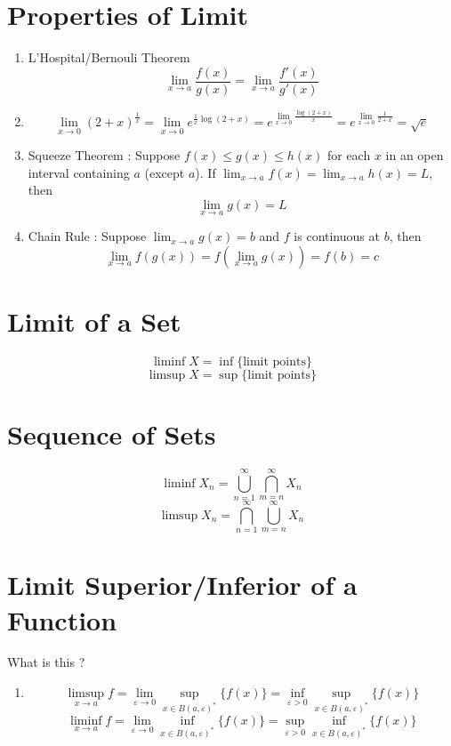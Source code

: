 \section{Properties of Limit}
\begin{enumerate}
	\item L'Hospital/Bernouli Theorem
	\[ \lim_{x \to a} \frac{f(x)}{g(x)} = \lim_{x \to a} \frac{f'(x)}{g'(x)} \]
	\item \[ \lim_{x \to 0} (2+x)^\frac{1}{x} = \lim_{x \to 0} e^{\frac{1}{x} \log (2+x)} = e^{\displaystyle \lim_{x \to 0} \frac{\log(2+x)}{x}} = e^{\displaystyle \lim_{x \to 0} \frac{1}{2+x}} = \sqrt{e} \]
	\item Squeeze Theorem :
	Suppose $f(x) \le g(x) \le h(x)$ for each $x$ in an open interval containing $a$ (except $a$).
	If $\displaystyle \lim_{x \to a} f(x) = \lim_{x \to a} h(x) = L$,  then
	\begin{equation}
		\lim_{x \to a} g(x) = L
		\label{equ:lim_squeeze}
	\end{equation}
	\item Chain Rule :
	Suppose $\displaystyle \lim_{x \to a} g(x) = b$ and $f$ is continuous at $b$, then
	\begin{equation}
		\lim_{x \to a} f(g(x)) = f(\lim_{x \to a} g(x)) = f(b) = c
	\end{equation}
\end{enumerate}

\section{Limit of a Set}
\begin{definition}
	\[ \liminf X = \inf \{ \text{limit points} \} \]
	\[ \limsup X = \sup \{ \text{limit points} \} \]
\end{definition}

\section{Sequence of Sets}
\begin{definition}
	\[ \liminf X_n = \bigcup_{n = 1}^\infty \bigcap_{m = n}^\infty X_n \]
	\[ \limsup X_n = \bigcap_{n = 1}^\infty \bigcup_{m = n}^\infty X_n \]
\end{definition}

\section{Limit Superior/Inferior of a Function} What is this ?
\begin{enumerate}
	\item \[ \limsup_{x \to a} f = \lim_{\varepsilon \to 0} \sup_{x \in B(a,\varepsilon)^\ast} \{ f(x) \} = \inf_{\varepsilon > 0} \sup_{x \in B(a,\varepsilon)^\ast} \{ f(x) \} \]
	\[ \liminf_{x \to a} f = \lim_{\varepsilon \to 0} \inf_{x \in B(a,\varepsilon)^\ast} \{ f(x) \} = \sup_{\varepsilon > 0} \inf_{x \in B(a,\varepsilon)^\ast} \{ f(x) \} \]
\end{enumerate}

